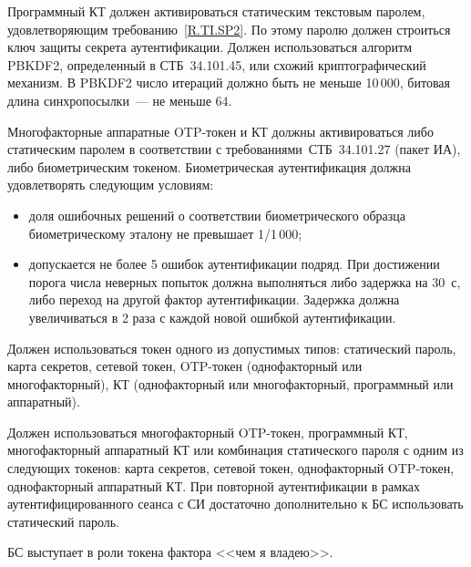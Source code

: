 
Программный КТ должен активироваться статическим текстовым  
паролем, удовлетворяющим требованию~\ref{R.TI.SP2}.
По этому паролю должен строиться ключ защиты секрета аутентификации.
Должен использоваться алгоритм PBKDF2, определенный в СТБ~34.101.45,
или схожий криптографический механизм.
%
В PBKDF2 число итераций должно быть не меньше 10\,000,
битовая длина синхропосылки~--- не меньше 64.

Многофакторные аппаратные OTP-токен и КТ должны активироваться 
либо статическим паролем в соответствии с требованиями~СТБ~34.101.27 (пакет ИА),
либо биометрическим токеном.
%
Биометрическая аутентификация должна удовлетворять следующим условиям:
\begin{itemize}
\item
доля ошибочных решений о соответствии биометрического образца биометрическому эталону 
не превышает 1/1\,000;
% 
%
%
\item
допускается не более 5 ошибок аутентификации подряд. При достижении порога числа
неверных попыток должна выполняться либо задержка на 30~с, либо
переход на другой фактор аутентификации. Задержка должна увеличиваться в 2 раза
с каждой новой ошибкой аутентификации.
\end{itemize}


Должен использоваться токен одного из допустимых типов:
статический пароль, карта секретов, сетевой токен,
OTP-токен (однофакторный или многофакторный), 
КТ (однофакторный или многофакторный, программный или аппаратный).

\label{R.TI.AAL2}
Должен использоваться многофакторный OTP-токен, программный КТ, многофакторный  
аппаратный КТ или комбинация статического пароля с одним из следующих токенов:
карта секретов, сетевой токен, однофакторный OTP-токен, 
однофакторный аппаратный КТ. 
%
При повторной аутентификации в рамках аутентифицированного сеанса с СИ 
достаточно дополнительно к БС использовать статический пароль.

\begin{note*}
БС выступает в роли токена фактора <<чем я владею>>.
\end{note*}

